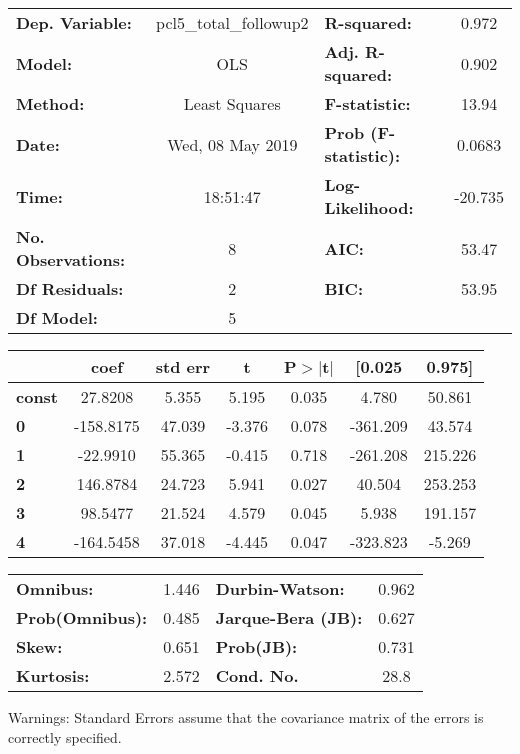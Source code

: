 \documentclass{report}
\begin{document}
\begin{center}
\begin{tabular}{lclc}
\toprule
\textbf{Dep. Variable:}    & pcl5_total_followup2 & \textbf{  R-squared:         } &     0.972   \\
\textbf{Model:}            &         OLS          & \textbf{  Adj. R-squared:    } &     0.902   \\
\textbf{Method:}           &    Least Squares     & \textbf{  F-statistic:       } &     13.94   \\
\textbf{Date:}             &   Wed, 08 May 2019   & \textbf{  Prob (F-statistic):} &   0.0683    \\
\textbf{Time:}             &       18:51:47       & \textbf{  Log-Likelihood:    } &   -20.735   \\
\textbf{No. Observations:} &             8        & \textbf{  AIC:               } &     53.47   \\
\textbf{Df Residuals:}     &             2        & \textbf{  BIC:               } &     53.95   \\
\textbf{Df Model:}         &             5        & \textbf{                     } &             \\
\bottomrule
\end{tabular}
\begin{tabular}{lcccccc}
               & \textbf{coef} & \textbf{std err} & \textbf{t} & \textbf{P$>$$|$t$|$} & \textbf{[0.025} & \textbf{0.975]}  \\
\midrule
\textbf{const} &      27.8208  &        5.355     &     5.195  &         0.035        &        4.780    &       50.861     \\
\textbf{0}     &    -158.8175  &       47.039     &    -3.376  &         0.078        &     -361.209    &       43.574     \\
\textbf{1}     &     -22.9910  &       55.365     &    -0.415  &         0.718        &     -261.208    &      215.226     \\
\textbf{2}     &     146.8784  &       24.723     &     5.941  &         0.027        &       40.504    &      253.253     \\
\textbf{3}     &      98.5477  &       21.524     &     4.579  &         0.045        &        5.938    &      191.157     \\
\textbf{4}     &    -164.5458  &       37.018     &    -4.445  &         0.047        &     -323.823    &       -5.269     \\
\bottomrule
\end{tabular}
\begin{tabular}{lclc}
\textbf{Omnibus:}       &  1.446 & \textbf{  Durbin-Watson:     } &    0.962  \\
\textbf{Prob(Omnibus):} &  0.485 & \textbf{  Jarque-Bera (JB):  } &    0.627  \\
\textbf{Skew:}          &  0.651 & \textbf{  Prob(JB):          } &    0.731  \\
\textbf{Kurtosis:}      &  2.572 & \textbf{  Cond. No.          } &     28.8  \\
\bottomrule
\end{tabular}
\end{center}

Warnings: \newline
 [1] Standard Errors assume that the covariance matrix of the errors is correctly specified.
\end{document}
